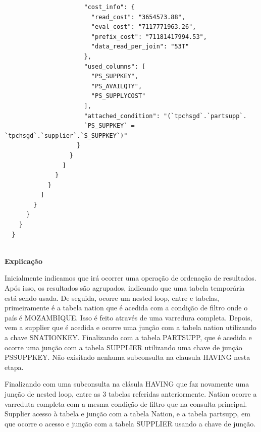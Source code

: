 \documentclass{article}
\begin{document}
\begin{lstlisting}
                      "cost_info": {
                        "read_cost": "3654573.88",
                        "eval_cost": "7117771963.26",
                        "prefix_cost": "71181417994.53",
                        "data_read_per_join": "53T"
                      },
                      "used_columns": [
                        "PS_SUPPKEY",
                        "PS_AVAILQTY",
                        "PS_SUPPLYCOST"
                      ],
                      "attached_condition": "(`tpchsgd`.`partsupp`.
                      `PS_SUPPKEY` = `tpchsgd`.`supplier`.`S_SUPPKEY`)"
                    }
                  }
                ]
              }
            }
          ]
        }
      }
    }
  }
  
\end{lstlisting}

\textbf{Explicação}\\
\texttt{}\par Inicialmente indicamos que irá ocorrer uma operação de ordenação de resultados.
Após isso, os resultados são agrupados, indicando que uma tabela temporária está sendo usada.
De seguida, ocorre um nested loop, entre e tabelas, primeiramente é a tabela nation que é acedida com a condição de filtro onde o país é MOZAMBIQUE. Isso é feito através de uma varredura completa. Depois, vem a supplier que é acedida e ocorre uma junção com a tabela nation utilizando a chave S\underline{}NATIONKEY. Finalizando com a tabela PARTSUPP, que é acedida e ocorre uma junção com a tabela SUPPLIER utilizando uma chave de junção PS\underline{}SUPPKEY. Não exisitndo nenhuma subconsulta na clausula HAVING nesta etapa.

Finalizando com uma subconsulta na clásula HAVING que faz novamente uma junção de nested loop, entre as 3 tabelas referidas anteriormente. Nation ocorre a varreduta completa com a mesma condição de filtro que na consulta principal. Supplier acesso à tabela e junção com a tabela Nation, e a tabela partsupp, em que ocorre o acesso e junção com a tabela SUPPLIER usando a chave de junção.
\end{document}
